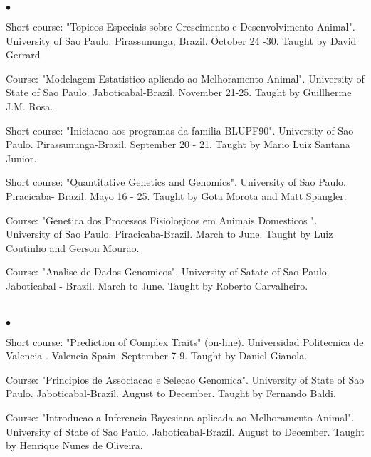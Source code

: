 \documentclass[margin,line,10pt]{res}
\newenvironment{list2}{
  \begin{list}{$\bullet$}{%
      \setlength{\itemsep}{0in}
      \setlength{\parsep}{0in} \setlength{\parskip}{0in}
      \setlength{\topsep}{0in} \setlength{\partopsep}{0in} 
      \setlength{\leftmargin}{0.2in}}}{\end{list}}
\begin{document}
\begin{resume}
\begin{list2}
  \item Short course: "Topicos Especiais sobre Crescimento e Desenvolvimento Animal". University of Sao Paulo. Pirassununga, Brazil. October 24 -30. Taught by David Gerrard
  \vspace{0.5cm}
  \item Course: "Modelagem Estatistico aplicado ao Melhoramento Animal". University of State of Sao Paulo. Jaboticabal-Brazil. November 21-25. Taught by Guillherme J.M. Rosa. 
  \vspace{0.5cm}
  \item Short course: "Iniciacao aos programas da familia BLUPF90". University of Sao Paulo. Pirassununga-Brazil. September 20 - 21. 
  Taught by Mario Luiz Santana Junior.
  \vspace{0.5cm}
  \item Short course: "Quantitative Genetics and Genomics". University of Sao Paulo. Piracicaba- Brazil. Mayo 16 - 25.
  Taught by Gota Morota and Matt Spangler.
  \vspace{0.5cm}
    \item Course: "Genetica dos Processos Fisiologicos em Animais Domesticos ". University of Sao Paulo. Piracicaba-Brazil. March to  June. Taught by Luiz Coutinho and Gerson Mourao.
  \vspace{0.5cm}
   \item Course: "Analise de Dados Genomicos". University of Satate of Sao Paulo. Jaboticabal - Brazil. March to June.
  Taught by Roberto Carvalheiro.
\end{list2}  
\vspace{0.5cm}

\section{}

\begin{list2}
  \item Short course: "Prediction of Complex Traits" (on-line). Universidad Politecnica de Valencia . Valencia-Spain. September 7-9. Taught by Daniel Gianola.
  \vspace{0.5cm}
  \item Course: "Principios de Associacao e Selecao Genomica". University of State of Sao Paulo. Jaboticabal-Brazil. August to December. Taught by Fernando Baldi.
  \vspace{0.5cm}
  \item Course: "Introducao a Inferencia Bayesiana aplicada ao Melhoramento Animal". University of State of Sao Paulo. Jaboticabal-Brazil. August to December. Taught by Henrique Nunes de Oliveira.
  \vspace{0.5cm}


\end{list2}
\end{resume}
\end{document}

